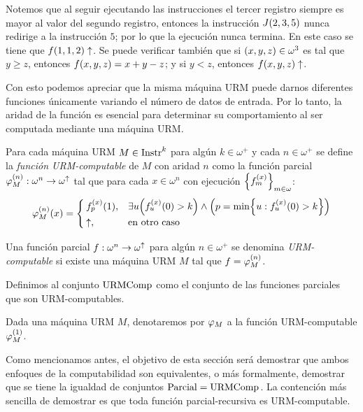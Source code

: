 Notemos que al seguir ejecutando las instrucciones el tercer registro siempre es mayor al valor del segundo registro, entonces la instrucción $J\pa*{2, 3, 5}$ nunca redirige a la instrucción $5$; por lo que la ejecución nunca termina. En este caso se tiene que $f\pa*{1, 1, 2}\DIVERGE$. Se puede verificar también que si $\pa*{x, y, z}\in\omega^{3}$ es tal que $y\geq z$, entonces $f\pa*{x, y, z} = x + y - z$; y si $y < z$, entonces $f\pa*{x, y, z}\DIVERGE$.

Con esto podemos apreciar que la misma máquina URM puede darnos diferentes funciones únicamente variando el número de datos de entrada. Por lo tanto, la aridad de la función es esencial para determinar su comportamiento al ser computada mediante una máquina URM.

\begin{definition}
	Para cada máquina URM $M\in\INSTRUCCIONES^{k}$ para algún $k\in\omega^{+}$ y cada $n\in\omega^{+}$ se define la \emph{función URM-computable} de $M$ con aridad $n$ como la función parcial $\PHI{M}[n]:\omega^{n}\to\omega^{\DIVERGE}$ tal que para cada $x\in\omega^{n}$ con ejecución $\set*{f_{m}^{\pa*{x}}}_{m\in\omega}$:
	\[
		\PHI{M}[n]\pa*{x} =
		\begin{cases}
			f_{p}^{\pa*{x}}\pa*{1}, &\exists u\pa*{f_{u}^{\pa*{x}}\pa*{0} > k}\land\pa*{p =\min\set*{u: f_{u}^{\pa*{x}}\pa*{0} > k}}\\
			\DIVERGE, &\text{en otro caso}
		\end{cases}
	\]

	Una función parcial $f:\omega^{n}\to\omega^{\DIVERGE}$ para algún $n\in\omega^{+}$ se denomina \emph{URM-computable} si existe una máquina URM $M$ tal que $f =\PHI{M}[n]$.

	Definimos al conjunto $\URMCOMPUTABLE$ como el conjunto de las funciones parciales que son URM-computables.
\end{definition}

\begin{notation}
	Dada una máquina URM $M$, denotaremos por $\PHI{M}$ a la función URM-computable $\PHI{M}[1]$.
\end{notation}

Como mencionamos antes, el objetivo de esta sección será demostrar que ambos enfoques de la computabilidad son equivalentes, o más formalmente, demostrar que se tiene la igualdad de conjuntos $\PARCIAL =\URMCOMPUTABLE$. La contención más sencilla de demostrar es que toda función parcial-recursiva es URM-computable.

